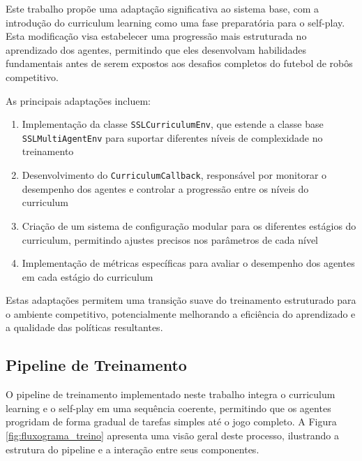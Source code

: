 Este trabalho propõe uma adaptação significativa ao sistema base, com a introdução do curriculum learning como uma fase preparatória para o self-play. Esta modificação visa estabelecer uma progressão mais estruturada no aprendizado dos agentes, permitindo que eles desenvolvam habilidades fundamentais antes de serem expostos aos desafios completos do futebol de robôs competitivo.

As principais adaptações incluem:

\begin{enumerate}
    \item Implementação da classe \texttt{SSLCurriculumEnv}, que estende a classe base \texttt{SSLMultiAgentEnv} para suportar diferentes níveis de complexidade no treinamento
    
    \item Desenvolvimento do \texttt{CurriculumCallback}, responsável por monitorar o desempenho dos agentes e controlar a progressão entre os níveis do curriculum
    
    \item Criação de um sistema de configuração modular para os diferentes estágios do curriculum, permitindo ajustes precisos nos parâmetros de cada nível
    
    \item Implementação de métricas específicas para avaliar o desempenho dos agentes em cada estágio do curriculum
\end{enumerate}

Estas adaptações permitem uma transição suave do treinamento estruturado para o ambiente competitivo, potencialmente melhorando a eficiência do aprendizado e a qualidade das políticas resultantes.

\subsection{Pipeline de Treinamento}

O pipeline de treinamento implementado neste trabalho integra o curriculum learning e o self-play em uma sequência coerente, permitindo que os agentes progridam de forma gradual de tarefas simples até o jogo completo. A Figura \ref{fig:fluxograma_treino} apresenta uma visão geral deste processo, ilustrando a estrutura do pipeline e a interação entre seus componentes.

